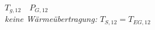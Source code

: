 

\item[b)] $T_{g,12} \quad P_{G,12}$ \\
    \textit{keine Wärmeübertragung:} \quad $T_{S,12} = T_{EG,12}$